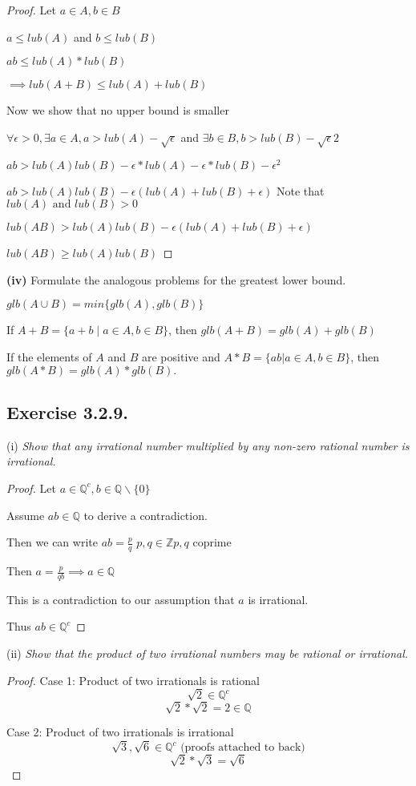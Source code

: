 \documentclass[12pt, a4paper]{article}
\begin{document}
        \begin{proof}
            Let $a\in A, b\in B$ 

            $a\le lub(A)$ and $b\le lub(B)$

            $ab \le lub(A)*lub(B)$
            
            $\implies lub(A+B) \le lub(A)+lub(B)$

            Now we show that no upper bound is smaller

            $\forall \epsilon > 0, \exists a\in A, a > lub(A)-\sqrt{\epsilon}$ and $\exists b\in B, b > lub(B)-\sqrt{\epsilon}{2}$

            $ab > lub(A)lub(B)-\epsilon *lub(A)-\epsilon *lub(B) - \epsilon^2$

            $ab > lub(A)lub(B)-\epsilon(lub(A)+lub(B)+\epsilon)$ Note that $lub(A) \text{ and } lub(B) > 0$

            $lub(AB) > lub(A)lub(B)-\epsilon(lub(A)+lub(B)+\epsilon)$

            $lub(AB) \ge lub(A)lub(B)$

        \end{proof}
    \noindent \textbf{(iv)} Formulate the analogous problems for the greatest lower bound.

            $glb(A \cup B) = min\{glb(A),glb(B)\}$

            If $A + B = \{a + b \mid a \in A, b \in B \}$, then $glb(A + B) = glb(A) + glb(B)$

            If the elements of $A$ and $B$ are positive and $A*B = \{ab | a \in A, b \in B\}$, then $glb(A * B) = glb(A)*glb(B).$
    \subsection*{Exercise 3.2.9.} 
    
    (i) \textit{Show that any irrational number multiplied by any non-zero rational
        number is irrational.}
    \begin{proof}
        Let $ a \in \mathbb{Q}^c, b\in \mathbb{Q}\backslash \{0\}$ 

        Assume $ab \in \mathbb{Q}$ to derive a contradiction. 

        Then we can write $ab = \frac{p}{q}$ $p,q \in \mathbb{Z} p,q $ coprime

        Then $a=\frac{p}{qb} \implies a \in \mathbb{Q}$

        This is a contradiction to our assumption that $a$ is irrational. 

        Thus $ab \in \mathbb{Q}^c$
    \end{proof}
    \noindent(ii) \textit{Show that the product of two irrational numbers may be rational or
        irrational.}
    \begin{proof}

        Case 1: Product of two irrationals is rational
        $$\sqrt{2} \in \mathbb{Q}^c$$ 
        $$\sqrt{2}*\sqrt{2} = 2 \in \mathbb{Q}$$

        Case 2: Product of two irrationals is irrational
        $$\sqrt{3}, \sqrt{6} \in \mathbb{Q}^c \text{ (proofs attached to back)}$$
        $$\sqrt{2}*\sqrt{3}=\sqrt{6}$$
    \end{proof}
\end{document}
